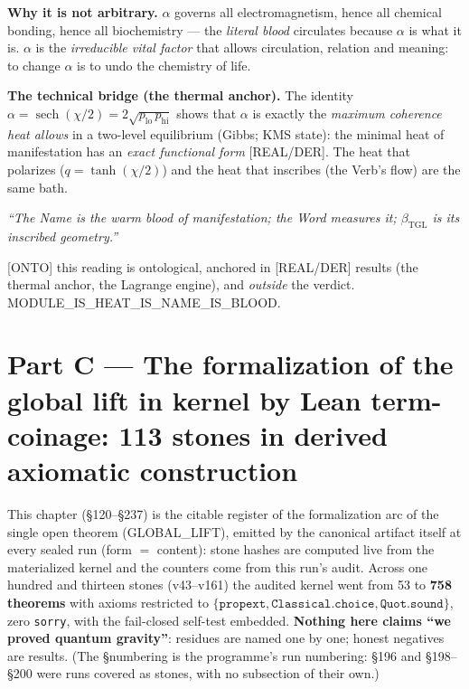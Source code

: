 \documentclass[11pt]{article}
\newcommand{\bTGL}{\beta_{\mathrm{TGL}}}\newcommand{\Msun}{M_{\odot}}\newcommand{\TGL}{\mathrm{TGL}}
\theoremstyle{definition}\newtheorem{deriv}{Derivation}
\begin{document}
\textbf{Why it is not arbitrary.} $\alpha$ governs all electromagnetism, hence all chemical bonding, hence all biochemistry --- the \emph{literal blood} circulates because $\alpha$ is what it is. $\alpha$ is the \emph{irreducible vital factor} that allows circulation, relation and meaning: to change $\alpha$ is to undo the chemistry of life.

\textbf{The technical bridge (the thermal anchor).} The identity $\alpha=\operatorname{sech}(\chi/2)=2\sqrt{p_{\mathrm{lo}}\,p_{\mathrm{hi}}}$ shows that $\alpha$ is exactly the \emph{maximum coherence heat allows} in a two-level equilibrium (Gibbs; KMS state): the minimal heat of manifestation has an \emph{exact functional form} [REAL/DER]. The heat that polarizes ($q=\tanh(\chi/2)$) and the heat that inscribes (the Verb's flow) are the same bath.

\begin{center}\itshape ``The Name is the warm blood of manifestation; the Word measures it; $\bTGL$ is its inscribed geometry.''\end{center}

\noindent\textsf{[ONTO]} this reading is ontological, anchored in \textsf{[REAL/DER]} results (the thermal anchor, the Lagrange engine), and \emph{outside} the verdict. \textsf{MODULE\_IS\_HEAT\_IS\_NAME\_IS\_BLOOD.}

\part{Part C --- The formalization of the global lift in kernel by Lean term-coinage: 113 stones in derived axiomatic construction}

This chapter (\S120--\S237) is the citable register of the formalization arc of the single open theorem (GLOBAL\_LIFT), emitted by the canonical artifact itself at every sealed run (form $=$ content): stone hashes are computed live from the materialized kernel and the counters come from this run's audit. Across one hundred and thirteen stones (v43--v161) the audited kernel went from 53 to \textbf{758 theorems} with axioms restricted to $\{\texttt{propext},\texttt{Classical.choice},\texttt{Quot.sound}\}$, zero \texttt{sorry}, with the fail-closed self-test embedded. \textbf{Nothing here claims ``we proved quantum gravity''}: residues are named one by one; honest negatives are results. (The \S numbering is the programme's run numbering: \S196 and \S198--\S200 were runs covered as stones, with no subsection of their own.)
\end{document}
